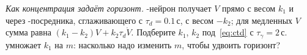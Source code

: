 \begin{exercise}[\lvlC]
\label{ex:05:8}
\emph{Как концентрация задаёт горизонт.} -нейрон получает $V$ прямо с весом $k_1$ и через -посредника, сглаживающего с $\tau_d=0.1\,\text{с}$, с весом $-k_2$; для медленных $V$ сумма равна $(k_1-k_2)V+k_2\tau_d\dot V$. Подберите $k_1$, $k_2$ под~\eqref{eq:ctd} с $\tau_\gamma=2\,\text{с}$.  умножает $k_1$ на $m$: насколько надо изменить $m$, чтобы удвоить горизонт?
\end{exercise}
